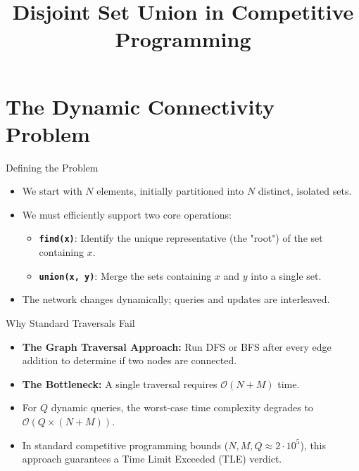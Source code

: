 \documentclass{beamer}
\begin{document}
\title{Disjoint Set Union in Competitive Programming}
\date{}

\begin{frame}[plain]
    \titlepage
\end{frame}

\section{ The Dynamic Connectivity Problem}

\begin{frame}[fragile]{Defining the Problem}
    \begin{itemize}
        \item We start with $N$ elements, initially partitioned into $N$ distinct, isolated sets.
        \item We must efficiently support two core operations:
        \begin{itemize}
            \item \textbf{\texttt{find(x)}}: Identify the unique representative (the "root") of the set containing $x$.
            \item \textbf{\texttt{union(x, y)}}: Merge the sets containing $x$ and $y$ into a single set.
        \end{itemize}
        \item The network changes dynamically; queries and updates are interleaved.
    \end{itemize}
\end{frame}

\begin{frame}[fragile]{Why Standard Traversals Fail}
    \begin{itemize}
        \item \textbf{The Graph Traversal Approach:} Run DFS or BFS after every edge addition to determine if two nodes are connected.
        \item \textbf{The Bottleneck:} A single traversal requires $\mathcal{O}(N + M)$ time.
        \item For $Q$ dynamic queries, the worst-case time complexity degrades to $\mathcal{O}(Q \times (N + M))$.
        \item In standard competitive programming bounds ($N, M, Q \approx 2 \cdot 10^5$), this approach guarantees a Time Limit Exceeded (TLE) verdict.
    \end{itemize}
\end{frame}
\end{document}
